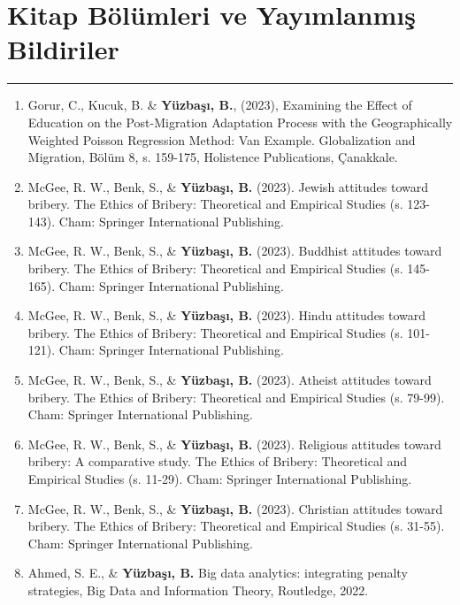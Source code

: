 \documentclass[10pt,a4paper]{article}
\newcommand{\NewPart}[2]{%
	\Needspace{7\baselineskip}%
	\vspace{0.45em}%
	\section*{\sffamily\large\bfseries\color{MidnightBlue}#1 #2}%
	\vspace{-0.7em}\noindent\color{MidnightBlue}\rule{\textwidth}{0.55pt}\color{Black}\vspace{0.25em}}
\newenvironment{etaremune}{\begin{enumerate}}{\end{enumerate}}
\begin{document}
\NewPart{Kitap Bölümleri ve Yayımlanmış Bildiriler}{}

\begin{etaremune}
\renewcommand{\theenumi}{B\arabic{enumi}}

\item Gorur, C., Kucuk, B. \& {\bf Y\"{u}zba\c{s}{\i}, B.}, (2023), Examining the Effect of Education on the Post-Migration Adaptation Process with the Geographically Weighted Poisson Regression Method: Van Example. Globalization and Migration, Bölüm 8, s. 159-175, Holistence Publications, Çanakkale.

\item McGee, R. W., Benk, S., \& {\bf Y\"{u}zba\c{s}{\i}, B.} (2023). Jewish attitudes toward bribery. The Ethics of Bribery: Theoretical and Empirical Studies (s. 123-143). Cham: Springer International Publishing.

\item McGee, R. W., Benk, S., \& {\bf Y\"{u}zba\c{s}{\i}, B.} (2023). Buddhist attitudes toward bribery. The Ethics of Bribery: Theoretical and Empirical Studies (s. 145-165). Cham: Springer International Publishing.

\item McGee, R. W., Benk, S., \& {\bf Y\"{u}zba\c{s}{\i}, B.} (2023). Hindu attitudes toward bribery. The Ethics of Bribery: Theoretical and Empirical Studies (s. 101-121). Cham: Springer International Publishing.

\item McGee, R. W., Benk, S., \& {\bf Y\"{u}zba\c{s}{\i}, B.} (2023). Atheist attitudes toward bribery. The Ethics of Bribery: Theoretical and Empirical Studies (s. 79-99). Cham: Springer International Publishing.

\item McGee, R. W., Benk, S., \& {\bf Y\"{u}zba\c{s}{\i}, B.} (2023). Religious attitudes toward bribery: A comparative study. The Ethics of Bribery: Theoretical and Empirical Studies (s. 11-29). Cham: Springer International Publishing.

\item McGee, R. W., Benk, S., \& {\bf Y\"{u}zba\c{s}{\i}, B.} (2023). Christian attitudes toward bribery. The Ethics of Bribery: Theoretical and Empirical Studies (s. 31-55). Cham: Springer International Publishing.

\item Ahmed, S. E., \& {\bf Y\"{u}zba\c{s}{\i}, B.} Big data analytics: integrating penalty strategies, Big Data and Information Theory, Routledge, 2022.


\end{etaremune}
\end{document}

